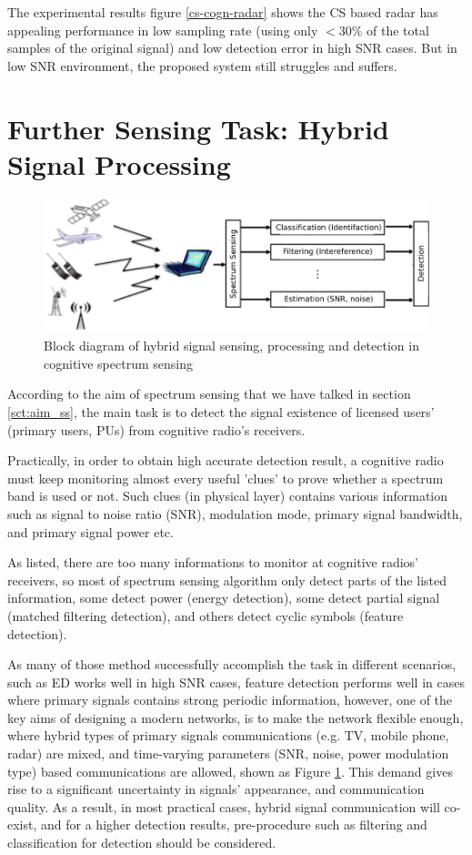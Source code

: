 The experimental results figure \ref{cs-cogn-radar} shows the CS based radar has appealing performance in low sampling rate (using only $ < 30\%$ of the total samples of the original signal) and low detection error in high SNR cases. But in low SNR environment, the proposed system still struggles and suffers. 

\newpage

\section{Further Sensing Task: Hybrid Signal Processing}

\begin{figure}
\centering
\includegraphics[width=0.75\columnwidth]{figs/hybrid_dsp.pdf}
\caption{Block diagram of hybrid signal sensing, processing and detection in cognitive spectrum sensing}
\label{hybrid_dsp}
\end{figure} 

According to the aim of spectrum sensing that we have talked in section \ref{sct:aim_ss}, the main task is to detect the signal existence of licensed users' (primary users, PUs) from cognitive radio's receivers.

Practically, in order to obtain high accurate detection result, a cognitive radio must keep monitoring almost every useful 'clues' to prove whether a spectrum band is used or not. Such clues (in physical layer) contains various information such as
signal to noise ratio (SNR), modulation mode, primary signal bandwidth, and primary signal power etc. 

As listed, there are too many informations to monitor at cognitive radios' receivers, so most of spectrum sensing algorithm only detect parts of the listed information, some detect power (energy detection), some detect partial signal (matched filtering detection), and others detect cyclic symbols (feature detection). 

As many of those method successfully accomplish the task in different scenarios, such as ED works well in high SNR cases, feature detection performs well in cases where primary signals contains strong periodic information, however, one of the key aims of designing a modern networks, is to make the network flexible enough, where hybrid types of primary signals communications (e.g. TV, mobile phone, radar) are mixed, and time-varying parameters (SNR, noise, power modulation type) based communications are allowed, shown as Figure \ref{hybrid_dsp}. This demand gives rise to a significant uncertainty in signals' appearance, and communication quality. As a result, in most practical cases, hybrid signal communication will co-exist, and for a higher detection results, pre-procedure such as filtering and classification for detection should be considered.

